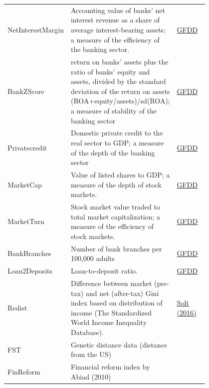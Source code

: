 \begin{refsection}
\begin{subappendices}
\begin{center}
\begin{longtable}{l p{0.50\linewidth} p{0.3\linewidth}}
      NetInterestMargin & Accounting value of banks' net interest revenue as a share of average interest-bearing assets; a measure of the efficiency of the banking sector. & \href{http://data.worldbank.org/data-catalog/global-financial-development}{GFDD} \\
      
      BankZScore & return on banks' assets plus the ratio of banks' equity and assets, divided
      by the standard deviation of the return on assets (ROA+equity/assets)/sd(ROA); a measure of stability of the banking sector & \href{http://data.worldbank.org/data-catalog/global-financial-development}{GFDD} \\
      
      Privatecredit & Domestic private credit to the real sector to GDP; a measure of the depth of the banking sector & \href{http://data.worldbank.org/data-catalog/global-financial-development}{GFDD} \\
      
      MarketCap & Value of listed shares to GDP; a measure of the
      depth of stock markets.& \href{http://data.worldbank.org/data-catalog/global-financial-development}{GFDD} \\
      
      MarketTurn & Stock market value traded to total market capitalization; a measure of the efficiency of stock markets. & \href{http://data.worldbank.org/data-catalog/global-financial-development}{GFDD} \\
      
      BankBranches & Number of bank branches per 100,000 adults & \href{http://data.worldbank.org/data-catalog/global-financial-development}{GFDD} \\
    
      Loan2Deposits & Loan-to-deposit ratio. & \href{http://data.worldbank.org/data-catalog/global-financial-development}{GFDD} \\
      
      Redist & Difference between market (pre-tax) and net (after-tax) Gini index based on distribution of income  (The Standardized World Income Inequality Database). & \href{http://fsolt.org/swiid/}{Solt (2016)} \\	
    
      FST & Genetic distance data (distance from the US) & \href{https://sites.tufts.edu/enricospolaore/research/}{\textcite{spolaore2009diffusion}} \\
    
      FinReform & Financial reform index by Abiad (2010) & \href{https://www.imf.org/en/Publications/WP/Issues/2016/12/31/A-New-Database-of-Financial-Reforms-22485}{\textcite{Abiadetal2008}} \\
    

\end{longtable}
\end{center}
\end{subappendices}
\end{refsection}
